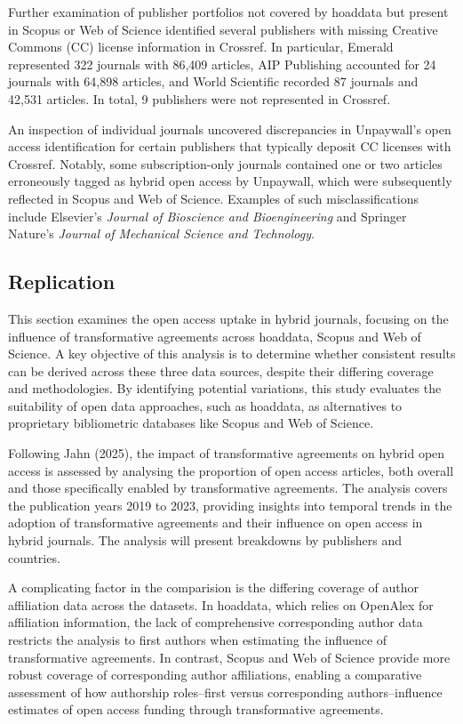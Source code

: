 \documentclass[a4paper,man,floatsintext,longtable,noextraspace,10pt]{apa6}
\begin{document}
Further examination of publisher portfolios not covered by hoaddata but
present in Scopus or Web of Science identified several publishers with
missing Creative Commons (CC) license information in Crossref. In
particular, Emerald represented 322 journals with 86,409 articles, AIP
Publishing accounted for 24 journals with 64,898 articles, and World
Scientific recorded 87 journals and 42,531 articles. In total, 9
publishers were not represented in Crossref.

An inspection of individual journals uncovered discrepancies in
Unpaywall's open access identification for certain publishers that
typically deposit CC licenses with Crossref. Notably, some
subscription-only journals contained one or two articles erroneously
tagged as hybrid open access by Unpaywall, which were subsequently
reflected in Scopus and Web of Science. Examples of such
misclassifications include Elsevier's \emph{Journal of Bioscience and
Bioengineering} and Springer Nature's \emph{Journal of Mechanical
Science and Technology}.

\subsection{Replication}\label{replication}

This section examines the open access uptake in hybrid journals,
focusing on the influence of transformative agreements across hoaddata,
Scopus and Web of Science. A key objective of this analysis is to
determine whether consistent results can be derived across these three
data sources, despite their differing coverage and methodologies. By
identifying potential variations, this study evaluates the suitability
of open data approaches, such as hoaddata, as alternatives to
proprietary bibliometric databases like Scopus and Web of Science.

Following Jahn (2025), the impact of transformative agreements on hybrid
open access is assessed by analysing the proportion of open access
articles, both overall and those specifically enabled by transformative
agreements. The analysis covers the publication years 2019 to 2023,
providing insights into temporal trends in the adoption of
transformative agreements and their influence on open access in hybrid
journals. The analysis will present breakdowns by publishers and
countries.

A complicating factor in the comparision is the differing coverage of
author affiliation data across the datasets. In hoaddata, which relies
on OpenAlex for affiliation information, the lack of comprehensive
corresponding author data restricts the analysis to first authors when
estimating the influence of transformative agreements. In contrast,
Scopus and Web of Science provide more robust coverage of corresponding
author affiliations, enabling a comparative assessment of how authorship
roles--first versus corresponding authors--influence estimates of open
access funding through transformative agreements.
\end{document}
